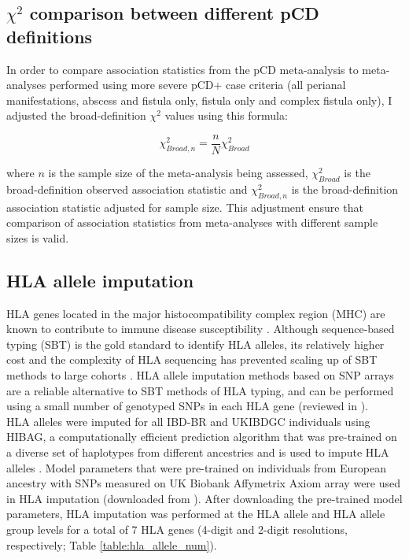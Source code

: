 \subsection{$\chi^{2}$ comparison between different pCD definitions}
\label{chi2_methods}
In order to compare association statistics from the pCD meta-analysis to meta-analyses performed using more severe pCD+ case criteria (all perianal manifestations, abscess and fistula only, fistula only and complex fistula only), I adjusted the broad-definition $\chi^{2}$ values using this formula:

 $$\chi^{2}_{Broad,n}=\frac{n}{N}\chi^{2}_{Broad}$$

where $n$ is the sample size of the meta-analysis being assessed, $\chi^{2}_{Broad}$ is the broad-definition observed association statistic and  $\chi^{2}_{Broad,n}$ is the broad-definition association statistic adjusted for sample size. This adjustment ensure that comparison of association statistics from meta-analyses with different sample sizes is valid.


\subsection{HLA allele imputation}
HLA genes located in the major histocompatibility complex region (MHC) are known to contribute to immune disease susceptibility \cite{Shiina2009-wt}. Although sequence-based typing (SBT) is the gold standard to identify HLA alleles, its relatively higher cost and the complexity of HLA sequencing has prevented scaling up of SBT methods to large cohorts \cite{Beksac2014-gm}. HLA allele imputation methods based on SNP arrays are a reliable alternative to SBT methods of HLA typing, and can be performed using a small number of genotyped SNPs in each HLA gene \cite{De_Bakker2006-ho,Monsuur2008-fk,Jia2013-mh,Zheng2014-mj,Cook2021-px,Naito2021-jl} (reviewed in \cite{Naito2022-qy}). \\

HLA alleles were imputed for all IBD-BR and UKIBDGC individuals using HIBAG, a computationally efficient prediction algorithm that was pre-trained on a diverse set of haplotypes from different ancestries and is used to impute HLA alleles \cite{Zheng2014-mj}. Model parameters that were pre-trained on individuals from European ancestry with SNPs measured on UK Biobank Affymetrix Axiom array were used in HLA imputation (downloaded from \cite{hibag-models-docs}). After downloading the pre-trained model parameters, HLA imputation was performed at the HLA allele and HLA allele group levels for a total of 7 HLA genes (4-digit and 2-digit resolutions, respectively; Table \ref{table:hla_allele_num}). 

